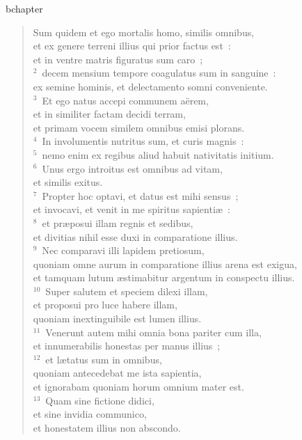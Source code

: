 bchapter\begin{verse}\vspace{-19pt}Sum quidem et ego mortalis homo, similis omnibus,\\ et ex genere terreni illius qui prior factus est~:\\ et in ventre matris figuratus sum caro~;\\
${}^{2}$~decem mensium tempore coagulatus sum in sanguine~:\\ ex semine hominis, et delectamento somni conveniente.\\
${}^{3}$~Et ego natus accepi communem a\"erem,\\ et in similiter factam decidi terram,\\ et primam vocem similem omnibus emisi plorans.\\
${}^{4}$~In involumentis nutritus sum, et curis magnis~:\\
${}^{5}$~nemo enim ex regibus aliud habuit nativitatis initium.\\
${}^{6}$~Unus ergo introitus est omnibus ad vitam,\\ et similis exitus.\\
${}^{7}$~Propter hoc optavi, et datus est mihi sensus~;\\ et invocavi, et venit in me spiritus sapienti\ae~:\\
${}^{8}$~et pr\ae posui illam regnis et sedibus,\\ et divitias nihil esse duxi in comparatione illius.\\
${}^{9}$~Nec comparavi illi lapidem pretiosum,\\ quoniam omne aurum in comparatione illius arena est exigua,\\ et tamquam lutum \ae stimabitur argentum in conspectu illius.\\
${}^{10}$~Super salutem et speciem dilexi illam,\\ et proposui pro luce habere illam,\\ quoniam inextinguibile est lumen illius.\\
${}^{11}$~Venerunt autem mihi omnia bona pariter cum illa,\\ et innumerabilis honestas per manus illius~;\\
${}^{12}$~et l\ae tatus sum in omnibus,\\ quoniam antecedebat me ista sapientia,\\ et ignorabam quoniam horum omnium mater est.\\
${}^{13}$~Quam sine fictione didici,\\ et sine invidia communico,\\ et honestatem illius non abscondo.\\

\end{verse}
